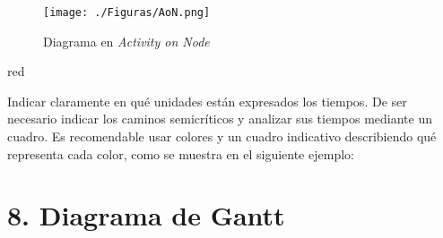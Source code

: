 \documentclass[11pt]{charter}
\begin{document}
\begin{figure}[htpb]
\centering 
\texttt{[image: ./Figuras/AoN.png]}
\caption{Diagrama en \textit{Activity on Node}}
\label{fig:AoN}
\end{figure}

\begin{consigna}{red}

Indicar claramente en qué unidades están expresados los tiempos.
De ser necesario indicar los caminos semicríticos y analizar sus tiempos mediante un cuadro.
Es recomendable usar colores y un cuadro indicativo describiendo qué representa cada color, como se muestra en el siguiente ejemplo:

\end{consigna}

\section{8. Diagrama de Gantt}
\label{sec:gantt}
\end{document}
